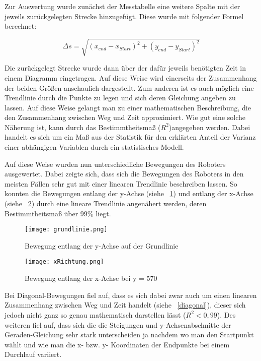 Zur Auswertung wurde zunächst der Messtabelle eine weitere Spalte mit der jeweils zurückgelegten Strecke hinzugefügt. Diese wurde mit folgender Formel berechnet: 

\begin{equation}
\Delta s=\sqrt{(x_{end}-x_{Start})^{2}+(y_{end}-y_{Start})^{2}}
\end{equation} 

Die zurückgelegt Strecke wurde dann über der dafür jeweils benötigten Zeit in einem Diagramm eingetragen. Auf diese Weise wird  einerseits der Zusammenhang der beiden Größen anschaulich dargestellt. Zum anderen ist es auch möglich eine Trendlinie durch die Punkte zu legen und sich deren Gleichung angeben zu lassen. Auf diese Weise gelangt man zu einer mathematischen Beschreibung, die den Zusammenhang zwischen Weg und Zeit approximiert. Wie gut eine solche Näherung ist, kann durch das Bestimmtheitsmaß ($ R^2 $)angegeben werden. Dabei handelt es sich um ein Maß aus der Statistik für den erklärten Anteil der Varianz einer abhängigen Variablen durch ein statistisches Modell. \cite{wiki:2016}

Auf diese Weise wurden nun unterschiedliche Bewegungen des Roboters ausgewertet. Dabei zeigte sich, dass sich die Bewegungen des Roboters in den meisten Fällen sehr gut mit einer linearen Trendlinie beschreiben lassen. So konnten die Bewegungen entlang der y-Achse (siehe ~\ref{yAchse}) und entlang der x-Achse (siehe ~\ref{xAchse}) durch eine lineare Trendlinie angenähert werden, deren Bestimmtheitsmaß über 99\% liegt. 

\begin{figure}[htbp]
\centering
\texttt{[image: grundlinie.png]}
\caption{Bewegung entlang der y-Achse auf der Grundlinie} 
\label{yAchse}
\end{figure}      

\begin{figure}[htbp]
\centering
\texttt{[image: xRichtung.png]}
\caption{Bewegung entlang der x-Achse bei y = 570} 
\label{xAchse}
\end{figure} 

Bei Diagonal-Bewegungen fiel auf, dass es sich dabei zwar auch um einen linearen Zusammenhang zwischen Weg und Zeit handelt (siehe ~\ref{diagonal}), dieser sich jedoch nicht ganz so genau mathematisch darstellen lässt ($ R^2 < 0,99 $). Des weiteren fiel auf, dass sich die die Steigungen und y-Achsenabschnitte der Geraden-Gleichung sehr stark unterscheiden ja nachdem wo man den Startpunkt wählt und wie man die x- bzw. y- Koordinaten der Endpunkte bei einem Durchlauf variiert. 


